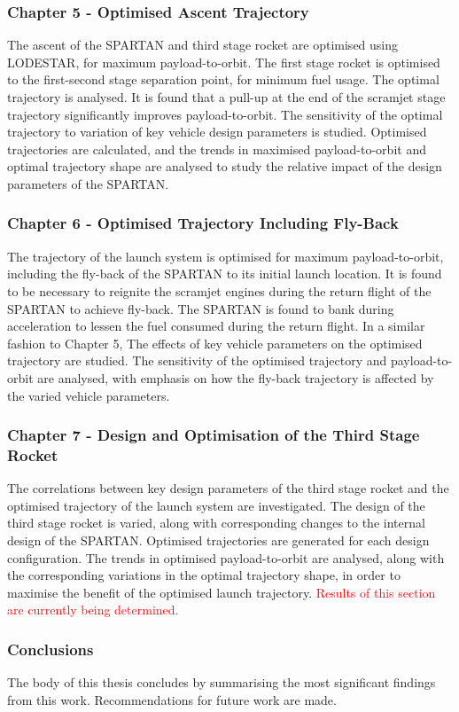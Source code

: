       \subsubsection*{Chapter 5 - Optimised Ascent Trajectory}
      

 The ascent of the SPARTAN and third stage rocket are optimised using LODESTAR, for maximum payload-to-orbit. The first stage rocket is optimised to the first-second stage separation point, for minimum fuel usage. The optimal trajectory is analysed. It is found that a pull-up at the end of the scramjet stage trajectory significantly improves payload-to-orbit.  
 The sensitivity of the optimal trajectory to variation of key vehicle design parameters is studied. Optimised trajectories are calculated, and the trends in maximised payload-to-orbit and optimal trajectory shape are analysed to study the relative impact of the design parameters of the SPARTAN. 
      
      \subsubsection*{Chapter 6 - Optimised Trajectory Including Fly-Back}
      
      The trajectory of the launch system is optimised for maximum payload-to-orbit, including the fly-back of the SPARTAN to its initial launch location. 
      It is found to be necessary to reignite the scramjet engines during the return flight of the SPARTAN to achieve fly-back.
      The SPARTAN is found to bank during acceleration to lessen the fuel consumed during the return flight.
      In a similar fashion to Chapter 5, The effects of key vehicle parameters on the optimised trajectory are studied. The sensitivity of the optimised trajectory and payload-to-orbit are analysed, with emphasis on how the fly-back trajectory is affected by the varied vehicle parameters.
      
      \subsubsection*{Chapter 7 - Design and Optimisation of the Third Stage Rocket}
      
      The correlations between key design parameters of the third stage rocket and the optimised trajectory of the launch system are investigated. The design of the third stage rocket is varied, along with corresponding changes to the internal design of the SPARTAN. Optimised trajectories are generated for each design configuration. The trends in optimised payload-to-orbit are analysed, along with the corresponding variations in the optimal trajectory shape, in order to maximise the benefit of the optimised launch trajectory.  
       \textcolor{red}{Results of this section are currently being determined.} 
      
     
      

    \subsubsection*{Conclusions}

      The body of this thesis concludes by summarising the most significant findings from this work. Recommendations for future work are made. 